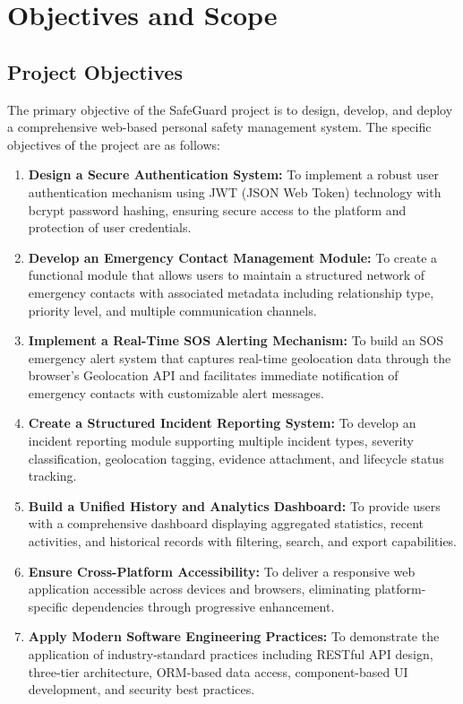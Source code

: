 \chapter{Objectives and Scope}

\section{Project Objectives}

The primary objective of the SafeGuard project is to design, develop, and deploy a comprehensive web-based personal safety management system. The specific objectives of the project are as follows:

\begin{enumerate}[label=\textbf{O\arabic*.}]
  \item \textbf{Design a Secure Authentication System:} To implement a robust user authentication mechanism using JWT (JSON Web Token) technology with bcrypt password hashing, ensuring secure access to the platform and protection of user credentials.

  \item \textbf{Develop an Emergency Contact Management Module:} To create a functional module that allows users to maintain a structured network of emergency contacts with associated metadata including relationship type, priority level, and multiple communication channels.

  \item \textbf{Implement a Real-Time SOS Alerting Mechanism:} To build an SOS emergency alert system that captures real-time geolocation data through the browser's Geolocation API and facilitates immediate notification of emergency contacts with customizable alert messages.

  \item \textbf{Create a Structured Incident Reporting System:} To develop an incident reporting module supporting multiple incident types, severity classification, geolocation tagging, evidence attachment, and lifecycle status tracking.

  \item \textbf{Build a Unified History and Analytics Dashboard:} To provide users with a comprehensive dashboard displaying aggregated statistics, recent activities, and historical records with filtering, search, and export capabilities.

  \item \textbf{Ensure Cross-Platform Accessibility:} To deliver a responsive web application accessible across devices and browsers, eliminating platform-specific dependencies through progressive enhancement.

  \item \textbf{Apply Modern Software Engineering Practices:} To demonstrate the application of industry-standard practices including RESTful API design, three-tier architecture, ORM-based data access, component-based UI development, and security best practices.
\end{enumerate}

